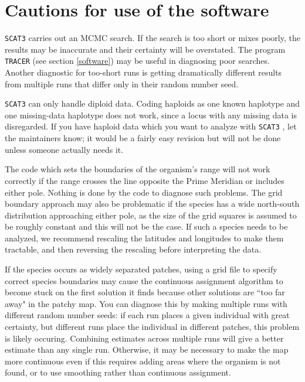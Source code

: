 \documentclass[10pt,titlepage,times,letterpaper]{article}
\def\SCAT{{\tt SCAT3} }
\begin{document}

\section{Cautions for use of the software} \label{cautions}

\SCAT carries out an MCMC search.  If the search is too short or mixes
poorly, the results may be inaccurate and their certainty will be overstated.  The program
{\tt TRACER} (see section \ref{software}) may be useful in diagnosing poor
searches.  Another diagnostic for too-short runs is getting dramatically different
results from multiple runs that differ only in their random number seed.

\SCAT can only handle diploid data.  Coding haploids as one known haplotype and
one missing-data haplotype does not work, since a locus with any missing
data is disregarded.  If you have haploid data which you want to analyze with \SCAT, 
let the maintainers know; it would be a fairly easy revision but will not be done unless
someone actually needs it.

The code which sets the boundaries of the organism's range
will not work correctly if the range crosses the line opposite
the Prime Meridian or includes either pole.  Nothing is done by the code to
diagnose such problems.  
The grid boundary approach may also be problematic if the species has a wide
north-south distribution approaching either pole, as the size of the grid 
squares is assumed to be roughly constant and this will not be the case.
If such a species needs to be analyzed, we recommend rescaling the latitudes and
longitudes to make them tractable, and then reversing the rescaling before
interpreting the data.  

If the species occurs as widely separated patches, using a grid file
to specify correct species boundaries may cause the continuous assignment algorithm
to become stuck on the first solution it finds because other solutions are 
``too far away" in the patchy map.  You can diagnose this by making
multiple runs with different random number seeds:  if each run places a
given individual with great certainty, but different runs place the
individual in different patches, this problem is likely occuring.  Combining
estimates across multiple runs will give a better estimate than any
single run.  Otherwise, it may be necessary to make the map more continuous
even if this requires adding areas where the organism is not found, or to
use smoothing rather than continuous assignment.
\end{document}
